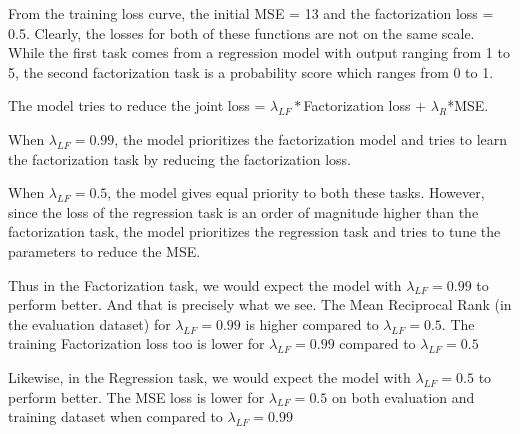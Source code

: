 \begin{answer}
From the training loss curve, the initial MSE = 13 and the factorization loss = 0.5. Clearly, the losses for both of these functions are not on the same scale. While the first task comes from a regression model with output ranging from 1 to 5, the second factorization task is a probability score which ranges from 0 to 1. 

The model tries to reduce the joint loss = $\lambda_{LF}*$Factorization loss + $\lambda_R$*MSE. 

When $\lambda_{LF} = 0.99$, the model prioritizes the factorization model and tries to learn the factorization task by reducing the factorization loss. 

When $\lambda_{LF} = 0.5$, the model gives equal priority to both these tasks. However, since the loss of the regression task is an order of magnitude higher than the factorization task, the model prioritizes the regression task and tries to tune the parameters to reduce the MSE.

Thus in the Factorization task, we would expect the model with $\lambda_{LF}=0.99$ to perform better. And that is precisely what we see. The Mean Reciprocal Rank (in the evaluation dataset) for $\lambda_{LF}=0.99$ is higher compared to $\lambda_{LF}=0.5$. The training Factorization loss too is lower for $\lambda_{LF}=0.99$ compared to $\lambda_{LF}=0.5$

Likewise, in the Regression task, we would expect the model with $\lambda_{LF}=0.5$ to perform better. The MSE loss is lower for $\lambda_{LF}=0.5$ on both evaluation and training dataset when compared to $\lambda_{LF}=0.99$ 


\end{answer}


